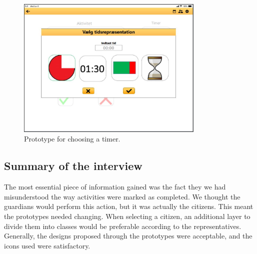 \begin{figure}[h!]
  \center
  \includegraphics[width=0.8\textwidth]{figures/select-timer-prototype.JPG}
  \caption{\label{fig:choose-timer-prototype} Prototype for choosing a timer.}
\end{figure}

\subsection{Summary of the interview}
The most essential piece of information gained was the fact they we had misunderstood the way activities were marked as completed.
We thought the guardians would perform this action, but it was actually the citizens.
This meant the prototypes needed changing.
When selecting a citizen, an additional layer to divide them into classes would be preferable according to the representatives.
Generally, the designs proposed through the prototypes were acceptable, and the icons used were satisfactory.
